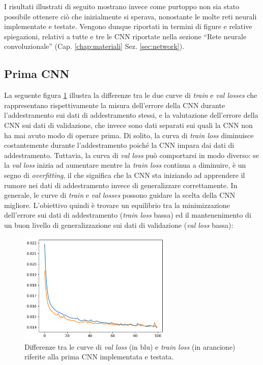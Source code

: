 I risultati illustrati di seguito mostrano invece come purtoppo non sia stato possibile ottenere ciò che inizialmente si sperava, nonostante le molte reti neurali implementate e testate. Vengono dunque riportati in termini di figure e relative spiegazioni, relativi a tutte e tre le CNN riportate nella sezione ``Rete neurale convoluzionale'' (Cap. \ref{chap:materiali} Sez. \ref{sec:network}).


\subsection{Prima CNN}
\label{subsec:prima_risultati}

La seguente figura \ref{fig:prima_cnn_primo_plot} illustra la differenze tra le due curve di \textit{train} e \textit{val losses} che rappresentano rispettivamente la misura dell'errore della CNN durante l'addestramento sui dati di addestramento stessi, e la valutazione dell'errore della CNN sui dati di validazione, che invece sono dati separati sui quali la CNN non ha mai avuto modo di operare prima. Di solito, la curva di \textit{train loss} diminuisce costantemente durante l'addestramento poiché la CNN impara dai dati di addestramento. Tuttavia, la curva di \textit{val loss} può comportarsi in modo diverso: se la \textit{val loss} inizia ad aumentare mentre la \textit{train loss} continua a diminuire, è un segno di \textit{overfitting}, il che significa che la CNN sta iniziando ad apprendere il rumore nei dati di addestramento invece di generalizzare correttamente. In generale, le curve di \textit{train} e \textit{val losses} possono guidare la scelta della CNN migliore. L'obiettivo quindi è trovare un equilibrio tra la minimizzazione dell'errore sui dati di addestramento (\textit{train loss} bassa) ed il mantenenimento di un buon livello di generalizzazione sui dati di validazione (\textit{val loss} bassa):

\begin{figure}[H]
    \centering
    \includegraphics[width=0.65\textwidth]{immagini/prima_cnn_primo_plot.png}
    \captionsetup{justification=centering}
    \caption{Differenze tra le curve di \textit{val loss} (in blu) e \textit{train loss} (in arancione) riferite alla prima CNN implementata e testata.}
    \label{fig:prima_cnn_primo_plot}
\end{figure}

